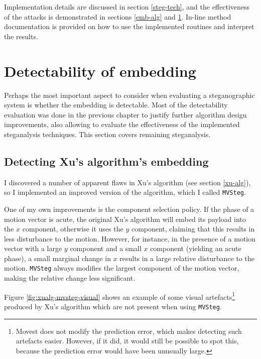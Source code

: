 \documentclass[12pt,british,twoside,notitlepage,usenames,dvipsnames,hypens,final]{report}
\numberwithin{equation}{section}
\numberwithin{figure}{section}
\begin{document}
Implementation details are discussed in section \ref{steg-tech}, and the effectiveness of the attacks is demonstrated in sections \ref{emb-alg} and \ref{rem-detect-eval}. In-line method documentation is provided on how to use the implemented routines and interpret the results. 

\section{Detectability of embedding}
\label{rem-detect-eval}

Perhaps the most important aspect to consider when evaluating a steganographic system is whether the embedding is detectable. Most of the detectability evaluation was done in the previous chapter to justify further algorithm design improvements, also allowing to evaluate the effectiveness of the implemented steganalysis techniques. This section covers remaining steganalysis.

\subsection{Detecting Xu's algorithm's embedding}
\label{breaking-xu}

I discovered a number of apparent flaws in Xu's algorithm (see section \ref{xu-alg}), so I implemented an improved version of the algorithm, which I called \texttt{MVSteg}.

One of my own improvements is the component selection policy. If the phase of a motion vector is acute, the original Xu's algorithm will embed its payload into the $x$ component, otherwise it uses the $y$ component, claiming that this results in less disturbance to the motion. However, for instance, in the presence of a motion vector with a large $y$ component and a small $x$ component (yielding an acute phase), a small marginal change in $x$ results in a large relative disturbance to the motion. \texttt{MVSteg} always modifies the largest component of the motion vector, making the relative change less significant.

Figure \ref{fig:xualg-mvsteg-visual} shows an example of some visual artefacts\footnote{Movest does not modify the prediction error, which makes detecting such artefacts easier. However, if it did, it would still be possible to spot this, because the prediction error would have been unusually large.} produced by Xu's algorithm which are not present when using \texttt{MVSteg}.
\end{document}
